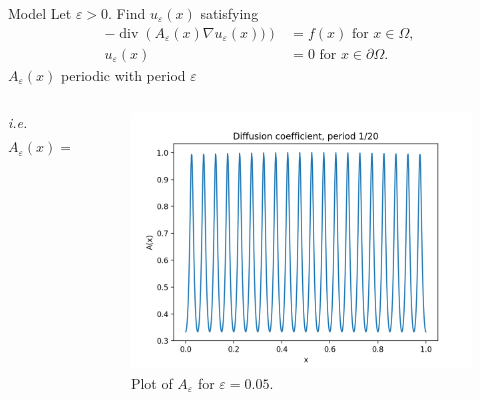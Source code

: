 \documentclass{beamer}
\renewcommand{\epsilon}{\varepsilon}
\renewcommand{\div}[1]{\operatorname{div}\left( #1 \right)}
\begin{document}
\begin{frame}[t]{Model}
    Let $\varepsilon>0$. Find $u_\varepsilon(x)$ satisfying
    \begin{equation}
        \begin{split}
            -\div{A_\varepsilon(x)\nabla u_\varepsilon(x))} &= f(x) \mbox{ for } x \in \Omega,\\
            u_\varepsilon(x) &= 0 \mbox{ for } x \in \partial\Omega.
        \end{split}
        \label{eq:model}
    \end{equation}
     $A_\varepsilon(x)$ periodic with period $\varepsilon$
     \begin{columns}
         \begin{column}[c]{.5\textwidth}
             \emph{i.e.}
             \[A_\varepsilon(x)= \frac{1}{2+\cos \left( \frac{2\pi x}{\epsilon} \right)}\]
         \end{column}
         \begin{column}[c]{.5\textwidth}
             \begin{figure}[th]
                \centering
                \includegraphics[width=0.9\linewidth]{a_eps.png}
                \caption{Plot of $A_\epsilon$ for $\epsilon=0.05$.}
                \label{fig:one_dim_exact}
            \end{figure}
         \end{column}
     \end{columns}

\end{frame}
\end{document}
